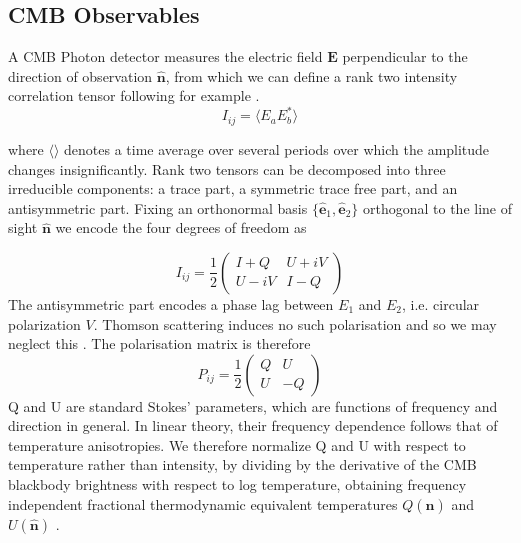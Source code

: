 \documentclass[a4paper,10pt]{article}
\renewcommand{\v}[1]{\mathbf{#1}}
\newcommand{\half}{\frac{1}{2}}
\newcommand{\unit}[1]{\hat{\v{#1}}}
\begin{document}
\subsection{CMB Observables}

A CMB Photon detector measures the electric field $\v{E}$ perpendicular to the direction of observation $\hat{\v{n}}$, from which we can define a rank two intensity correlation tensor following for example \cite{baldauf,lewis}.
\begin{equation}
I_{ij} = \langle E_aE_b^* \rangle
\end{equation}

where $\langle\rangle$ denotes a time average over several periods over which the amplitude changes insignificantly. Rank two tensors can be decomposed into three irreducible components: a trace part, a symmetric trace free part, and an antisymmetric part.  Fixing an orthonormal basis $\{\unit{e}_1,\unit{e}_2\}$ orthogonal to the line of sight $\unit{n}$ we encode the four degrees of freedom as 


\begin{equation}
I_{ij} =
\half\begin{pmatrix}
I+Q & U+iV\\ 
U-iV & I-Q
\end{pmatrix}
\end{equation}
The antisymmetric part encodes a phase lag between $E_1$ and $E_2$, i.e. circular polarization $V$. Thomson scattering induces no such polarisation and so we may neglect this \cite{kowosky}. The polarisation matrix is therefore 
\begin{equation}
P_{ij} =\half \begin{pmatrix}
Q & U\\ 
U & -Q
\end{pmatrix}
\end{equation}
Q and U are standard Stokes' parameters, which are functions of frequency and direction in general. In linear theory, their frequency dependence follows that of temperature anisotropies. We therefore normalize Q and U with respect to temperature rather than intensity, by dividing by the derivative of the CMB blackbody brightness with respect to log temperature, obtaining frequency independent fractional thermodynamic equivalent temperatures $Q(\unit{n})$ and $U(\unit{n})$ \cite{notes}. \\
\end{document}
